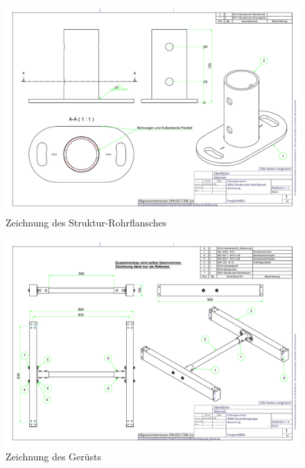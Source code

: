 \begin{figure}[h!]
	\includegraphics[angle=90,width=\textwidth]{../ref/0001-Struktrurohr-Rohrflansch.pdf}
	\caption{Zeichnung des Struktur-Rohrflansches}
	\label{fig:Zeichnung-Strukturrohrflansch}
\end{figure}

\begin{figure}[h!]
	\includegraphics[angle=90,width=\textwidth]{../ref/0000-Gesamtbaugruppe_Rahmen.pdf}
	\caption{Zeichnung des Gerüsts}
	\label{fig:Zeichnung-Gerüst}
\end{figure}

